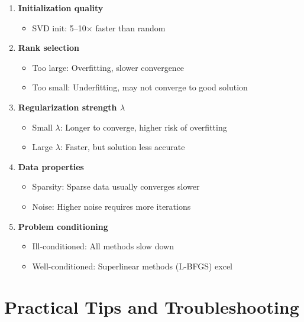 \documentclass[11pt,oneside]{article}
\begin{document}
\begin{enumerate}
    \item \textbf{Initialization quality}
    \begin{itemize}
        \item SVD init: 5--10$\times$ faster than random
    \end{itemize}
    
    \item \textbf{Rank selection}
    \begin{itemize}
        \item Too large: Overfitting, slower convergence
        \item Too small: Underfitting, may not converge to good solution
    \end{itemize}
    
    \item \textbf{Regularization strength $\lambda$}
    \begin{itemize}
        \item Small $\lambda$: Longer to converge, higher risk of overfitting
        \item Large $\lambda$: Faster, but solution less accurate
    \end{itemize}
    
    \item \textbf{Data properties}
    \begin{itemize}
        \item Sparsity: Sparse data usually converges slower
        \item Noise: Higher noise requires more iterations
    \end{itemize}
    
    \item \textbf{Problem conditioning}
    \begin{itemize}
        \item Ill-conditioned: All methods slow down
        \item Well-conditioned: Superlinear methods (L-BFGS) excel
    \end{itemize}
\end{enumerate}

\section{Practical Tips and Troubleshooting}\label{sec:troubleshooting}
\end{document}
